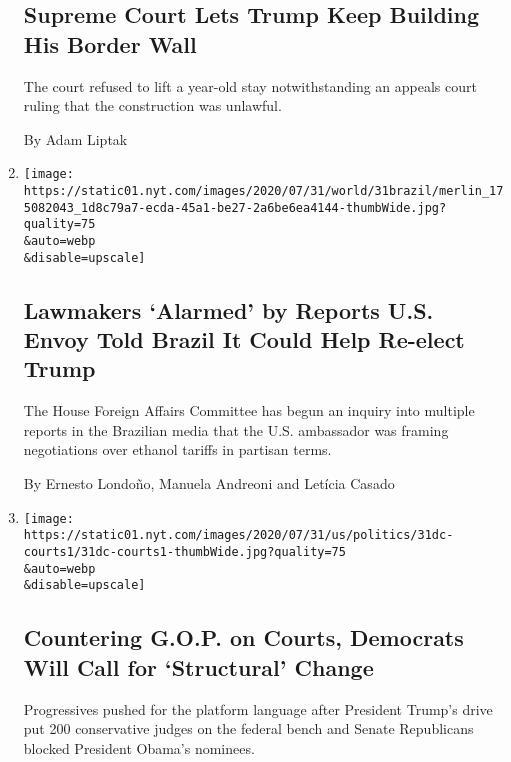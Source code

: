 \begin{enumerate}
  \hypertarget{supreme-court-lets-trump-keep-building-his-border-wall}{%
  \subsection{Supreme Court Lets Trump Keep Building His Border
  Wall}\label{supreme-court-lets-trump-keep-building-his-border-wall}}

  The court refused to lift a year-old stay notwithstanding an appeals
  court ruling that the construction was unlawful.

  By Adam Liptak
\item
  \href{/2020/07/31/world/americas/brazil-trump-ethanol-chapman.html}{}

  \texttt{[image: https://static01.nyt.com/images/2020/07/31/world/31brazil/merlin\_175082043\_1d8c79a7-ecda-45a1-be27-2a6be6ea4144-thumbWide.jpg?quality=75\\\&auto=webp\\\&disable=upscale]}

  \hypertarget{lawmakers-alarmed-by-reports-us-envoy-told-brazil-it-could-help-re-elect-trump}{%
  \subsection{Lawmakers `Alarmed' by Reports U.S. Envoy Told Brazil It
  Could Help Re-elect
  Trump}\label{lawmakers-alarmed-by-reports-us-envoy-told-brazil-it-could-help-re-elect-trump}}

  The House Foreign Affairs Committee has begun an inquiry into multiple
  reports in the Brazilian media that the U.S. ambassador was framing
  negotiations over ethanol tariffs in partisan terms.

  By Ernesto Londoño, Manuela Andreoni and Letícia Casado
\item
  \href{/2020/07/31/us/democrats-judiciary-reform.html}{}

  \texttt{[image: https://static01.nyt.com/images/2020/07/31/us/politics/31dc-courts1/31dc-courts1-thumbWide.jpg?quality=75\\\&auto=webp\\\&disable=upscale]}

  \hypertarget{countering-gop-on-courts-democrats-will-call-for-structural-change}{%
  \subsection{Countering G.O.P. on Courts, Democrats Will Call for
  `Structural'
  Change}\label{countering-gop-on-courts-democrats-will-call-for-structural-change}}

  Progressives pushed for the platform language after President Trump's
  drive put 200 conservative judges on the federal bench and Senate
  Republicans blocked President Obama's nominees.


\end{enumerate}
